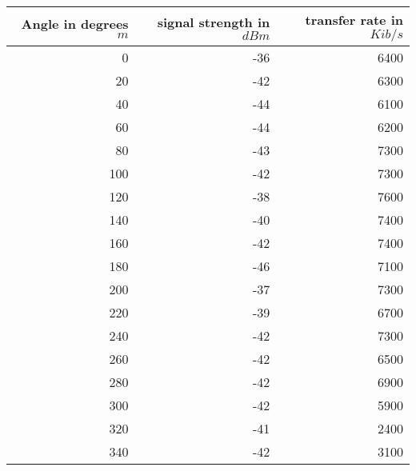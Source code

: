 \begin{table}
	\begin{center}
		\begin{tabular}{r|r|r}\
			Angle in degrees $m$ & signal strength in $dBm$ & transfer rate in $Kib/s$\\
			\hline 
			0 & -36 & 6400\\
			20 & -42 & 6300\\
			40 & -44 & 6100\\
			60 & -44 & 6200\\
			80 & -43 & 7300\\
			100 & -42 & 7300\\
			120 & -38 & 7600\\
			140 & -40 & 7400\\
			160 & -42 & 7400\\
			180 & -46 & 7100\\
			200 & -37 & 7300\\
			220 & -39 & 6700\\
			240 & -42 & 7300\\
			260 & -42 & 6500\\
			280 & -42 & 6900\\
			300 & -42 & 5900\\
			320 & -41 & 2400\\
			340 & -42 & 3100\\
		\end{tabular}
	\end{center}
\end{table}